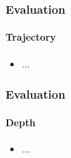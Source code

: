 \begin{frame}
    \frametitle{Evaluation}
    \framesubtitle{Trajectory}
    \begin{itemize}
        \item ...
    \end{itemize}
\end{frame}

\begin{frame}
    \frametitle{Evaluation}
    \framesubtitle{Depth}
    \begin{itemize}
        \item ...
    \end{itemize}
\end{frame}
